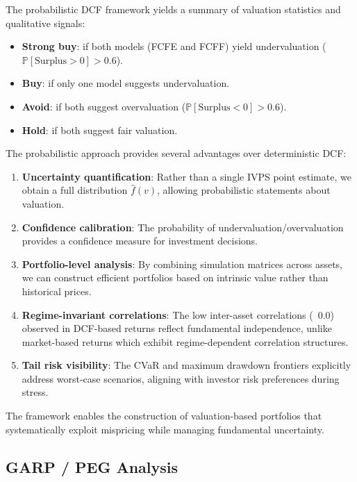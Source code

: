The probabilistic DCF framework yields a summary of valuation statistics and qualitative signals:

\begin{itemize}
  \item \textbf{Strong buy}: if both models (FCFE and FCFF) yield undervaluation ($\mathbb{P}[\text{Surplus} > 0] > 0.6$).
  \item \textbf{Buy}: if only one model suggests undervaluation.
  \item \textbf{Avoid}: if both suggest overvaluation ($\mathbb{P}[\text{Surplus} < 0] > 0.6$).
  \item \textbf{Hold}: if both suggest fair valuation.
\end{itemize}

The probabilistic approach provides several advantages over deterministic DCF:

\begin{enumerate}
  \item \textbf{Uncertainty quantification}: Rather than a single IVPS point estimate, we obtain a full distribution $\hat{f}(v)$, allowing probabilistic statements about valuation.

  \item \textbf{Confidence calibration}: The probability of undervaluation/overvaluation provides a confidence measure for investment decisions.

  \item \textbf{Portfolio-level analysis}: By combining simulation matrices across assets, we can construct efficient portfolios based on intrinsic value rather than historical prices.

  \item \textbf{Regime-invariant correlations}: The low inter-asset correlations (~0.0) observed in DCF-based returns reflect fundamental independence, unlike market-based returns which exhibit regime-dependent correlation structures.

  \item \textbf{Tail risk visibility}: The CVaR and maximum drawdown frontiers explicitly address worst-case scenarios, aligning with investor risk preferences during stress.
\end{enumerate}

The framework enables the construction of valuation-based portfolios that systematically exploit mispricing while managing fundamental uncertainty.

\newpage\subsection{GARP / PEG Analysis}

